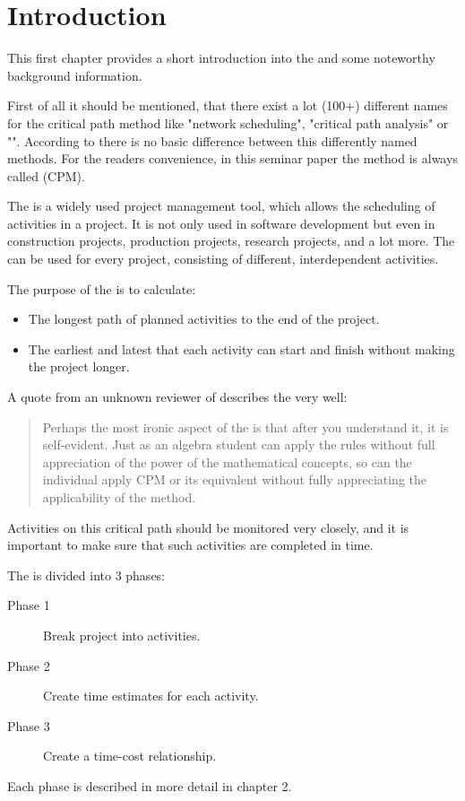 \section{Introduction}

This first chapter provides a short introduction into the \cpm{} and some noteworthy
background information.

First of all it should be mentioned, that there exist a lot (100+) different names for  the critical
path method like "network scheduling", "critical path analysis" or "\cpm{}". According
to \cite{dua} there is no basic difference between this differently named methods. For the readers
convenience, in this seminar paper the method is always called \cpm{} (CPM). 

The \cpm{} is a widely used project management tool, which allows the scheduling of
activities in a project. It is not only used in software development but even in construction
projects, production projects, research projects, and a lot more. The \cpm{} can be
used for every project, consisting of different, interdependent activities.  

The purpose of the \cpm{} is to calculate\cite{santiago}:
\begin{itemize}
  \item The longest path of planned activities to the end of the project.
  \item The earliest and latest that each activity can start and finish without making the project longer.
\end{itemize}

A quote from an unknown reviewer of \cite{obrien} describes the \cpm{} very well:

\begin{quotation}
Perhaps the most ironic aspect of the \cpm{} is that after you understand it, it is
self-evident. Just as an algebra student can apply the rules without full appreciation of the power
of the mathematical concepts, so can the individual apply CPM or its equivalent without fully
appreciating the applicability of the method.
\end{quotation}

Activities on this critical path should be monitored very closely, and it is important to make sure
that such activities are completed in time. 

The \cpm{} is divided into 3 phases:
\begin{description}
  \item[Phase 1] Break project into activities.
  \item[Phase 2] Create time estimates for each activity. 
  \item[Phase 3] Create a time-cost relationship.
\end{description}
Each phase is described in more detail in chapter 2.

